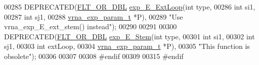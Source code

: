 \begin{DoxyCode}
00285 DEPRECATED(\hyperlink{group__data__structures_ga31125aeace516926bf7f251f759b6126}{FLT\_OR\_DBL} \hyperlink{group__eval__deprecated_ga446828a191c127861e76e2c84055f672}{exp\_E\_ExtLoop}(\textcolor{keywordtype}{int}               type,
00286                                     \textcolor{keywordtype}{int}               si1,
00287                                     \textcolor{keywordtype}{int}               sj1,
00288                                     \hyperlink{group__energy__parameters_structvrna__exp__param__s}{vrna\_exp\_param\_t}  *P),
00289            \textcolor{stringliteral}{"Use vrna\_exp\_E\_ext\_stem() instead"});
00290 
00291 
00300 DEPRECATED(\hyperlink{group__data__structures_ga31125aeace516926bf7f251f759b6126}{FLT\_OR\_DBL} \hyperlink{group__eval__deprecated_gab0aa9833ab41875a91a9be8a5ffd7092}{exp\_E\_Stem}(\textcolor{keywordtype}{int}              type,
00301                                  \textcolor{keywordtype}{int}              si1,
00302                                  \textcolor{keywordtype}{int}              sj1,
00303                                  \textcolor{keywordtype}{int}              extLoop,
00304                                  \hyperlink{group__energy__parameters_structvrna__exp__param__s}{vrna\_exp\_param\_t} *P),
00305            \textcolor{stringliteral}{"This function is obsolete"});
00306 
00307 
00308 \textcolor{preprocessor}{#endif}
00309 
00315 \textcolor{preprocessor}{#endif}
\end{DoxyCode}
